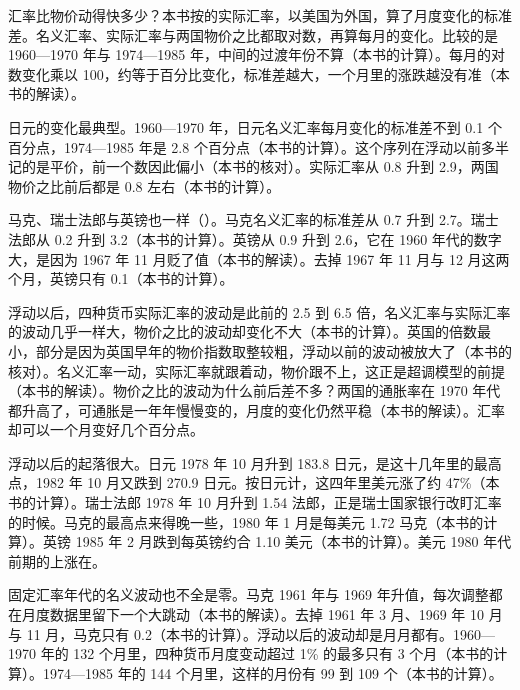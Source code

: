 汇率比物价动得快多少？本书按的实际汇率，以美国为外国，算了月度变化的标准差。名义汇率、实际汇率与两国物价之比都取对数，再算每月的变化\cite{bisdata46}。比较的是 1960—1970 年与 1974—1985 年，中间的过渡年份不算（本书的计算）。每月的对数变化乘以 100，约等于百分比变化，标准差越大，一个月里的涨跌越没有准（本书的解读）。

日元的变化最典型。1960—1970 年，日元名义汇率每月变化的标准差不到 0.1 个百分点，1974—1985 年是 2.8 个百分点（本书的计算）。这个序列在浮动以前多半记的是平价，前一个数因此偏小（本书的核对）。实际汇率从 0.8 升到 2.9，两国物价之比前后都是 0.8 左右（本书的计算）。

马克、瑞士法郎与英镑也一样（）。马克名义汇率的标准差从 0.7 升到 2.7。瑞士法郎从 0.2 升到 3.2（本书的计算）。英镑从 0.9 升到 2.6，它在 1960 年代的数字大，是因为 1967 年 11 月贬了值（本书的解读）。去掉 1967 年 11 月与 12 月这两个月，英镑只有 0.1（本书的计算）。

浮动以后，四种货币实际汇率的波动是此前的 2.5 到 6.5 倍，名义汇率与实际汇率的波动几乎一样大，物价之比的波动却变化不大（本书的计算）。英国的倍数最小，部分是因为英国早年的物价指数取整较粗，浮动以前的波动被放大了（本书的核对）。名义汇率一动，实际汇率就跟着动，物价跟不上，这正是超调模型的前提（本书的解读）。物价之比的波动为什么前后差不多？两国的通胀率在 1970 年代都升高了，可通胀是一年年慢慢变的，月度的变化仍然平稳（本书的解读）。汇率却可以一个月变好几个百分点。


浮动以后的起落很大。日元 1978 年 10 月升到 183.8 日元，是这十几年里的最高点，1982 年 10 月又跌到 270.9 日元\cite{bisdata46}。按日元计，这四年里美元涨了约 47\%（本书的计算）。瑞士法郎 1978 年 10 月升到 1.54 法郎，正是瑞士国家银行改盯汇率的时候\cite{bisdata46}。马克的最高点来得晚一些，1980 年 1 月是每美元 1.72 马克（本书的计算）。英镑 1985 年 2 月跌到每英镑约合 1.10 美元（本书的计算）。美元 1980 年代前期的上涨在。

固定汇率年代的名义波动也不全是零。马克 1961 年与 1969 年升值，每次调整都在月度数据里留下一个大跳动（本书的解读）。去掉 1961 年 3 月、1969 年 10 月与 11 月，马克只有 0.2（本书的计算）。浮动以后的波动却是月月都有。1960—1970 年的 132 个月里，四种货币月度变动超过 1\% 的最多只有 3 个月（本书的计算）。1974—1985 年的 144 个月里，这样的月份有 99 到 109 个（本书的计算）。

